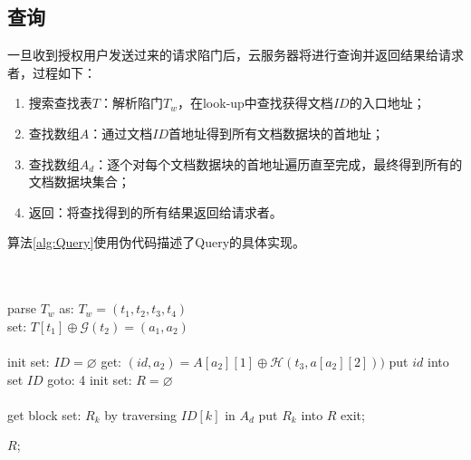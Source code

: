 \subsection{查询}
\label{sec:searchpattern_scheme_search}
一旦收到授权用户发送过来的请求陷门后，云服务器将进行查询并返回结果给请求者，过程如下：
\begin{enumerate}
  \item 搜索查找表$T$：解析陷门$T_w$，在look-up中查找获得文档$ID$的入口地址；

  \item 查找数组$A$：通过文档$ID$首地址得到所有文档数据块的首地址；

  \item 查找数组$A_d$：逐个对每个文档数据块的首地址遍历直至完成，最终得到所有的文档数据块集合；

  \item 返回：将查找得到的所有结果返回给请求者。
\end{enumerate}
算法\ref{alg:Query}使用伪代码描述了Query的具体实现。

\begin{algorithm}[!htb]
\caption{$R \leftarrow Query(T_w, I, A_d)$}
\label{alg:Query}
\begin{algorithmic} [1]
\ENSURE ~~\\
   ~~\\
  \STATE parse $T_w$ as: $T_w = (t_1, t_2, t_3, t_4)$ ~~\\
         set: $T[t_1] \oplus \mathcal{G}(t_2) = (a_1, a_2)$ ~~\\
   ~~\\
    \STATE init set: $ID = \varnothing $
    \STATE get: $(id, a_2) = A[a_2][1] \oplus \mathcal{H}(t_3,a[a_2][2]))$
    \STATE put $id$ into set $ID$
      \STATE goto: 4
    \ENDIF
    \STATE init set: $R = \varnothing$ ~~\\
     ~~\\
      \STATE get block set: $R_k$ by traversing $ID[k]$ in $A_d$
      \STATE put $R_k$ into $R$
    \ENDFOR
  \ELSE
    \STATE exit;
  \ENDIF

  \RETURN ${R}$;
\end{algorithmic}
\end{algorithm}



